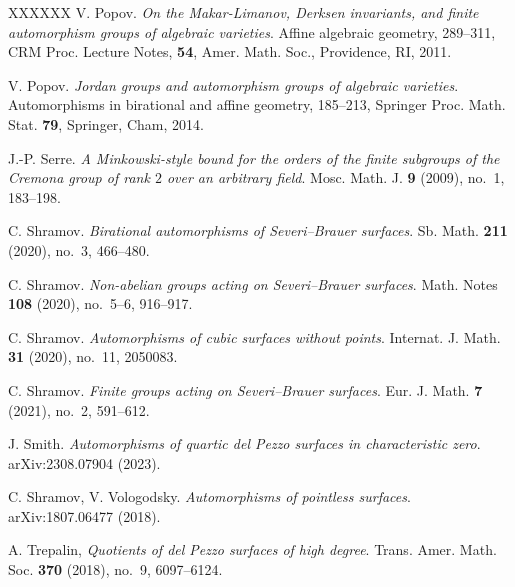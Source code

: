 \documentclass[12pt]{amsart}
\theoremstyle{definition}
\theoremstyle{remark}
\begin{document}
\begin{thebibliography}{XXXXXX}
V. Popov. \emph{On the Makar-Limanov, Derksen invariants, and finite automorphism groups of algebraic varieties}.
Affine algebraic geometry, 289--311, CRM Proc. Lecture Notes, \textbf{54}, Amer. Math. Soc., Providence, RI, 2011.

V. Popov. \emph{Jordan groups and automorphism groups
of algebraic varieties}.
Automorphisms in birational and affine geometry, 185--213,
Springer Proc. Math. Stat. \textbf{79}, Springer, Cham, 2014.


J.-P. Serre. \emph{A Minkowski-style bound for the orders of the finite subgroups of the Cremona group of rank $2$ over an arbitrary field}.
Mosc. Math. J. \textbf{9} (2009), no.~1, 183--198.

C. Shramov. \emph{Birational automorphisms of Severi--Brauer
surfaces}. Sb. Math. \textbf{211} (2020), no.~3, 466--480.


C. Shramov. \emph{Non-abelian
groups acting on Severi--Brauer surfaces}.
Math. Notes \textbf{108} (2020), no.~5--6, 916--917.

C. Shramov. \emph{Automorphisms of cubic surfaces without points}.
Internat. J. Math. \textbf{31} (2020), no.~11, 2050083.


C. Shramov. \emph{Finite
groups acting on Severi--Brauer surfaces}.
Eur. J. Math. \textbf{7} (2021), no.~2, 591--612.

J. Smith. \emph{Automorphisms of quartic del Pezzo surfaces in characteristic zero}.
arXiv:2308.07904  (2023).


C. Shramov, V. Vologodsky.
\emph{Automorphisms of pointless surfaces}.
arXiv:1807.06477 (2018).




A. Trepalin,  \emph{Quotients of del Pezzo surfaces of high degree}.
Trans. Amer. Math. Soc. \textbf{370} (2018), no.~9, 6097--6124.



\end{thebibliography}
\end{document}
